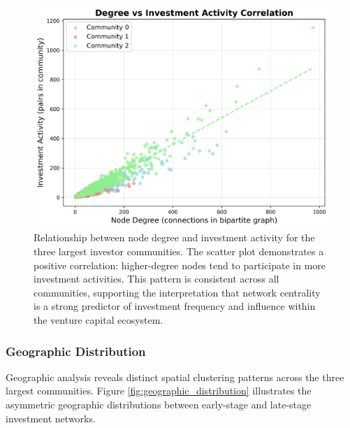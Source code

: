 \begin{figure}[htpb]
\centering
\includegraphics[width=1\textwidth]{../figures/us/degree_vs_investment_corr.png}
\caption{Relationship between node degree and investment activity for the three largest investor communities. The scatter plot demonstrates a positive correlation: higher-degree nodes tend to participate in more investment activities. This pattern is consistent across all communities, supporting the interpretation that network centrality is a strong predictor of investment frequency and influence within the venture capital ecosystem.}
\label{fig:degree_vs_activity}
\end{figure}

\subsubsection{Geographic Distribution}

Geographic analysis reveals distinct spatial clustering patterns across the three largest communities. Figure \ref{fig:geographic_distribution} illustrates the asymmetric geographic distributions between early-stage and late-stage investment networks.


